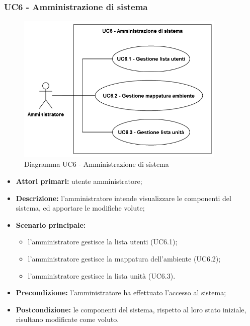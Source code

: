 \subsubsection{UC6 - Amministrazione di sistema}
	\begin{figure}[H]
		\centering
		\includegraphics[width=10cm]{images/UC6.png}
		\caption{Diagramma UC6 - Amministrazione di sistema}
	\end{figure}
	\begin{itemize}
		\item \textbf{Attori primari:} utente amministratore;
		\item \textbf{Descrizione:} l'amministratore intende visualizzare le componenti del sistema, ed apportare le modifiche volute;
		\item \textbf{Scenario principale:} 
			\begin{itemize}
				\item l'amministratore gestisce la lista utenti (UC6.1);
				\item l'amministratore gestisce la mappatura dell'ambiente (UC6.2);
				\item l'amministratore gestisce la lista unità (UC6.3).
			\end{itemize}
		\item \textbf{Precondizione:} l'amministratore ha effettuato l'accesso al sistema;
		\item \textbf{Postcondizione:} le componenti del sistema, rispetto al loro stato iniziale, risultano modificate come voluto.
	\end{itemize}
	
